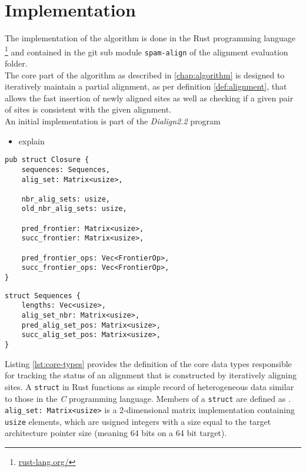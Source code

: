 \chapter{Implementation}
The implementation of the algorithm is done in the Rust programming language \footnote{\href{rust-lang.org/}{rust-lang.org/}} and contained in the git sub module \texttt{spam-align} of the alignment evaluation folder.\\


The core part of the algorithm as described in \ref{chap:algorithm} is designed to iteratively maintain a partial alignment, as per definition \ref{def:alignment}, that allows the fast insertion of newly aligned sites as well as checking if a given pair of sites is consistent with the given alignment.\\
An initial implementation is part of the \textit{Dialign2.2} program
\begin{itemize}
	\item explain 
\end{itemize}

\begin{multicols}{2}
\begin{verbatim}
pub struct Closure {
	sequences: Sequences,
	alig_set: Matrix<usize>,
	
	nbr_alig_sets: usize,
	old_nbr_alig_sets: usize,
	
	pred_frontier: Matrix<usize>,
	succ_frontier: Matrix<usize>,
	
	pred_frontier_ops: Vec<FrontierOp>,
	succ_frontier_ops: Vec<FrontierOp>,
}
\end{verbatim}

\begin{verbatim}
struct Sequences {
	lengths: Vec<usize>,
	alig_set_nbr: Matrix<usize>,
	pred_alig_set_pos: Matrix<usize>,
	succ_alig_set_pos: Matrix<usize>,
}
\end{verbatim}
\label{lst:core-types}
\end{multicols}

Listing \ref{lst:core-types} provides the definition of the core data types responsible for tracking the status of an alignment that is constructed by iteratively aligning sites. A \texttt{struct} in Rust functions as simple record of heterogeneous data similar to those in the \textit{C} programming language. Members of a \texttt{struct} are defined as .\\
\texttt{alig_set: Matrix<usize>} is a 2-dimensional matrix implementation containing \texttt{usize} elements, which are usigned integers with a size equal to the target architecture pointer size (meaning 64 bits on a 64 bit target). 


